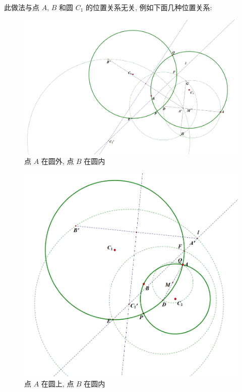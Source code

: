 \begin{remark}
    此做法与点 $A$, $B$ 和圆 $C_1$ 的位置关系无关, 例如下面几种位置关系:
    \begin{figure}[htbp]
        \centering
        \includegraphics[scale = 0.31]{Figures/怀新一题(2).png}
        \caption{点 $A$ 在圆外, 点 $B$ 在圆内}                 
    \end{figure}
    \begin{figure}[htbp]
        \centering
        \includegraphics[scale = 0.31]{Figures/怀新一题(3).png}
        \caption{点 $A$ 在圆上, 点 $B$ 在圆内}
    \end{figure}
    \begin{figure}[htbp]

\end{figure}
\end{remark}
